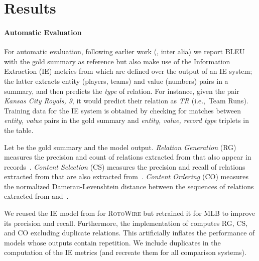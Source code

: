 \documentclass[11pt,a4paper]{article}
\newcommand{\lform}[1]{\textsf{\scriptsize{#1}}}
\begin{document}
\section{Results}
\label{sec:results}





\paragraph{Automatic Evaluation}

For automatic evaluation, following earlier work
(\citealt{wiseman-etal-2017-challenges,DBLP:journals/corr/abs-1809-00582,puduppully-etal-2019-data},
inter alia) we report BLEU \cite{papineni-etal-2002-bleu} with
the gold summary as reference but also make use of the Information
Extraction (IE) metrics from \citet{wiseman-etal-2017-challenges}
which are defined over the output of an IE system; the latter extracts
entity (players, teams) and value (numbers) pairs in a summary, and
then predicts the \textsl{type} of relation. For instance, given the pair
\textsl{Kansas City Royals, 9}, it would predict their relation as
\textsl{\lform{\normalsize TR}} (i.e.,~Team Runs).  Training data for
the IE system is obtained by checking for matches between
\textsl{entity, value} pairs in the gold summary and
\textsl{entity, value, record type} triplets in the table.






Let  be the gold summary and  the model
output. \textsl{Relation Generation} (RG) measures the precision and
count of relations extracted from  that also appear in
records~. \textsl{Content Selection} (CS) measures the precision
and recall of relations extracted from  that are also extracted
from~.  \textsl{Content Ordering} (CO) measures the
normalized Damerau-Levenshtein distance between the sequences of
relations extracted from  and~.

We reused the IE model from \citet{DBLP:journals/corr/abs-1809-00582}
for \textsc{RotoWire} but retrained it for MLB to improve its
precision and recall. Furthermore, the implementation of
\citet{wiseman-etal-2017-challenges} computes RG, CS, and CO excluding
duplicate relations. This artificially inflates the performance of
models whose outputs contain repetition. We include duplicates in the
computation of the IE metrics (and recreate them for all comparison
systems).
\end{document}
